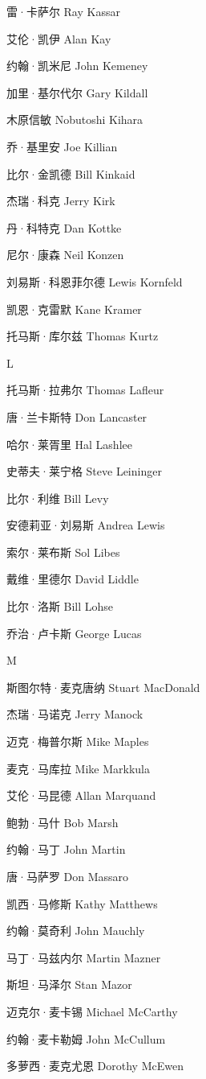 \documentclass[12pt,UTF8]{ctexbook}
\begin{document}
雷·卡萨尔 Ray Kassar

艾伦·凯伊 Alan Kay

约翰·凯米尼 John Kemeney

加里·基尔代尔 Gary Kildall

木原信敏 Nobutoshi Kihara

乔·基里安 Joe Killian

比尔·金凯德 Bill Kinkaid

杰瑞·科克 Jerry Kirk

丹·科特克 Dan Kottke

尼尔·康森 Neil Konzen

刘易斯·科恩菲尔德 Lewis Kornfeld

凯恩·克雷默 Kane Kramer

托马斯·库尔兹 Thomas Kurtz

L

托马斯·拉弗尔 Thomas Lafleur

唐·兰卡斯特 Don Lancaster

哈尔·莱胥里 Hal Lashlee

史蒂夫·莱宁格 Steve Leininger

比尔·利维 Bill Levy

安德莉亚·刘易斯 Andrea Lewis

索尔·莱布斯 Sol Libes

戴维·里德尔 David Liddle

比尔·洛斯 Bill Lohse

乔治·卢卡斯 George Lucas

M

斯图尔特·麦克唐纳 Stuart MacDonald

杰瑞·马诺克 Jerry Manock

迈克·梅普尔斯 Mike Maples

麦克·马库拉 Mike Markkula

艾伦·马昆德 Allan Marquand

鲍勃·马什 Bob Marsh

约翰·马丁 John Martin

唐·马萨罗 Don Massaro

凯西·马修斯 Kathy Matthews

约翰·莫奇利 John Mauchly

马丁·马兹内尔 Martin Mazner

斯坦·马泽尔 Stan Mazor

迈克尔·麦卡锡 Michael McCarthy

约翰·麦卡勒姆 John McCullum

多萝西·麦克尤恩 Dorothy McEwen
\end{document}
